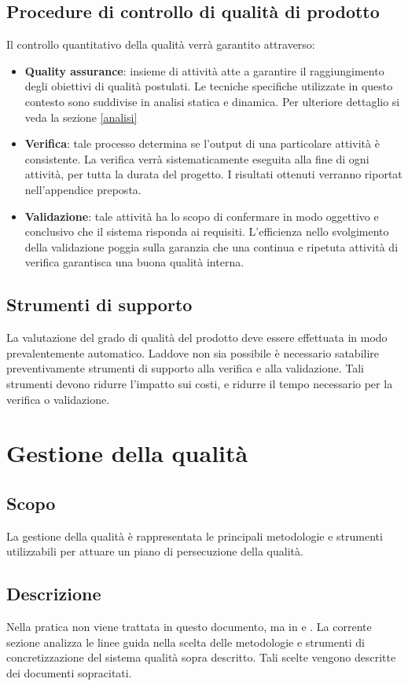 \documentclass[12pt,a4paper]{article}
\begin{document}
\subsection{Procedure di controllo di qualità di prodotto}\label{sec:procedure-di-controllo-di-qualità-di-prodotto}
Il controllo quantitativo della qualità verrà garantito attraverso:
\begin{itemize}
	\item{\textbf{Quality assurance}}: insieme di attività atte a garantire il raggiungimento degli obiettivi di qualità postulati. 
	Le tecniche specifiche utilizzate in questo contesto sono suddivise in analisi statica e dinamica. Per ulteriore dettaglio si veda la sezione \ref{analisi}
	\item{\textbf{Verifica}}: tale processo determina se l'output di una particolare attività è consistente. La verifica verrà sistematicamente eseguita alla fine di ogni attività, per tutta la durata del progetto. I risultati ottenuti verranno riportat nell'appendice preposta.
	\item{\textbf{Validazione}}: tale attività ha lo scopo di confermare in modo oggettivo e conclusivo che il sistema risponda ai requisiti. L'efficienza nello svolgimento della validazione poggia sulla garanzia che una continua e ripetuta attività di verifica garantisca una buona qualità interna.
\end{itemize}
\subsection{Strumenti di supporto}
La valutazione del grado di qualità del prodotto deve essere effettuata in modo prevalentemente automatico. Laddove non sia possibile è necessario satabilire preventivamente strumenti di supporto alla verifica e alla validazione. Tali strumenti devono ridurre l'impatto sui costi, e ridurre il tempo necessario per la verifica o validazione. 


\section{Gestione della qualità}\label{gest_qual}
\subsection{Scopo}
La gestione della qualità è rappresentata le principali metodologie e strumenti utilizzabili per attuare un piano di persecuzione della qualità. 

\subsection{Descrizione}
Nella pratica non viene trattata in questo documento, ma in \PdP e \NdP.
La corrente sezione analizza le linee guida nella scelta delle metodologie e strumenti di concretizzazione del sistema qualità sopra descritto. Tali scelte vengono descritte dei documenti sopracitati.
\end{document}
